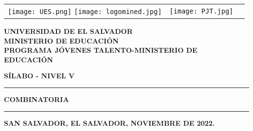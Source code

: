 \begin{center}
	\begin{tabular}{l b{12cm} r}
\texttt{[image: UES.png]}
		\hspace{3cm}\texttt{[image: logomined.jpg]}
		&
		\hspace{2cm} \texttt{[image: PJT.jpg]}
		& 

\end{tabular}
\end{center}


\begin{center}
 {\bf
UNIVERSIDAD DE EL SALVADOR\\ [0.3cm]
MINISTERIO DE EDUCACI\'ON \\ [0.3cm]
PROGRAMA JÓVENES TALENTO-MINISTERIO DE EDUCACIÓN }  \\ [1.3cm]
\end{center}

\begin{center}

{\bf \Large SÍLABO - NIVEL V}\\  
\vspace{0.3ex}%
\rule{\textwidth}{2pt}
{\Huge \bf COMBINATORIA\\  
\vspace{0.7ex}%
\rule{\textwidth}{2pt}
 }
\end{center}

\vspace{0.3cm}

\begin{center}
\end{center}

\vspace{0.3cm}

\begin{center}
{\bf SAN SALVADOR, EL SALVADOR, NOVIEMBRE DE 2022.}
\end{center}








